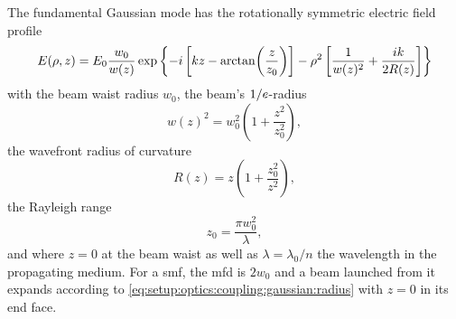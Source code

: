 The fundamental Gaussian  mode has the rotationally symmetric electric field profile~\cite{Yariv1989}
\begin{equation}\label{eq:setup:optics:coupling:efield:tem00}
E(\rho, z) = E_0\frac{w_0}{w(z)}\exp\left\lbrace -i\left[kz - \arctan(\frac{z}{z_0})\right] - \rho^2\left[\frac{1}{w(z)^2} + \frac{ik}{2 R(z)}\right]\right\rbrace
\end{equation}
with the beam waist radius $w_0$, the beam's $1/e$-radius
\begin{equation}\label{eq:setup:optics:coupling:gaussian:radius}
    w(z)^2 = w_0^2\left(1 + \frac{z^2}{z_0^2}\right),
\end{equation}
the wavefront radius of curvature
\begin{equation}
    R(z) = z\left(1 + \frac{z_0^2}{z^2}\right),
\end{equation}
the Rayleigh range
\begin{equation}\label{eq:setup:optics:coupling:gaussian:rayleigh_range}
    z_0 = \frac{\pi w_0^2}{\lambda},
\end{equation}
and where $z=0$ at the beam waist as well as $\lambda = \lambda_0/n$ the wavelength in the propagating medium.
For a \gls{smf}, the \gls{mfd} is $2 w_0$ and a beam launched from it expands according to \cref{eq:setup:optics:coupling:gaussian:radius} with $z=0$ in its end face.

